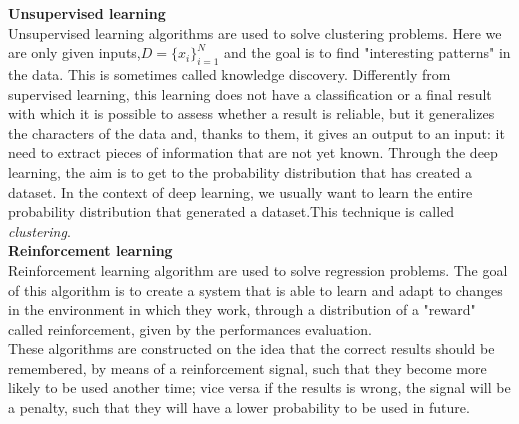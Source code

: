 \documentclass[a4paper,12pt]{report}
\begin{document}
\textbf{Unsupervised learning}\\
Unsupervised learning algorithms are used to solve clustering problems.
Here we are only given inputs,$D={\{ x_{i}\}}^{N}_{i=1}$ and the goal is to find "interesting patterns" in the data. This is sometimes called knowledge discovery. Differently from supervised learning, this learning does not have a classification or a final result with which it is possible to assess whether a result is reliable, but it generalizes the characters of the data and, thanks to them, it gives an output to an input: it need to extract pieces of information that are not yet known. Through the deep learning, the aim is to get to the probability distribution that has created a dataset. In the context of deep learning, we usually want to learn the entire probability distribution that generated a dataset.This technique is called \textit{clustering}.\\

\textbf{Reinforcement learning}\\
Reinforcement learning algorithm are used to solve regression problems.
The goal of this algorithm is to create a system that is able to learn and adapt to changes in the environment in which they work, through a distribution of a "reward" called reinforcement, given by the performances evaluation.\\
These algorithms are constructed on the idea that the correct results should be remembered, by means of a reinforcement signal, such that they become more likely to be used another time; vice versa if the results is wrong, the signal will be a penalty, such that they will have a lower probability to be used in future.
\end{document}
